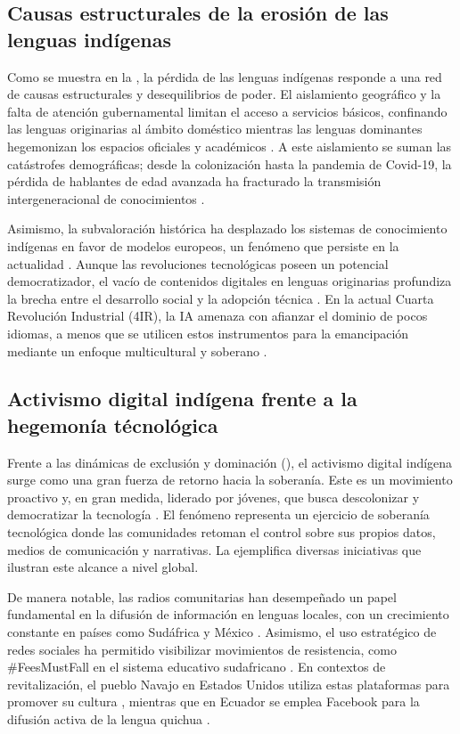 \documentclass[spanish]{textolivre}
\begin{document}
\subsection{Causas estructurales de la erosión de las lenguas indígenas}
Como se muestra en la , la pérdida de las lenguas indígenas responde a una red de causas estructurales y desequilibrios de poder. El aislamiento geográfico y la falta de atención gubernamental limitan el acceso a servicios básicos, confinando las lenguas originarias al ámbito doméstico mientras las lenguas dominantes hegemonizan los espacios oficiales y académicos  \cite{Uekusa2019}. A este aislamiento se suman las catástrofes demográficas; desde la colonización hasta la pandemia de Covid-19, la pérdida de hablantes de edad avanzada ha fracturado la transmisión intergeneracional de conocimientos \cite{GutierrezFonseca2021}.


Asimismo, la subvaloración histórica ha desplazado los sistemas de conocimiento indígenas en favor de modelos europeos, un fenómeno que persiste en la actualidad \cite{GarcesVelasquez2020,Makgopa2022}. Aunque las revoluciones tecnológicas poseen un potencial democratizador, el vacío de contenidos digitales en lenguas originarias profundiza la brecha entre el desarrollo social y la adopción técnica \cite{DeanceBravoTroncoso2017,Joshi2020}. En la actual Cuarta Revolución Industrial (4IR), la IA amenaza con afianzar el dominio de pocos idiomas, a menos que se utilicen estos instrumentos para la emancipación mediante un enfoque multicultural y soberano \cite{Marwala2023}.


\subsection{Activismo digital indígena frente a la hegemonía técnológica}

Frente a las dinámicas de exclusión y dominación (), el activismo digital indígena surge como una gran fuerza de retorno hacia la soberanía. Este es un movimiento proactivo y, en gran medida, liderado por jóvenes, que busca descolonizar y democratizar la tecnología \cite{Marmion2014}. El fenómeno representa un ejercicio de soberanía tecnológica donde las comunidades retoman el control sobre sus propios datos, medios de comunicación y narrativas. La  ejemplifica diversas iniciativas que ilustran este alcance a nivel global.

De manera notable, las radios comunitarias han desempeñado un papel fundamental en la difusión de información en lenguas locales, con un crecimiento constante en países como Sudáfrica \cite{Mkontwana2013} \cite{Omusonga2023} y México \cite{GobiernoMexico2023}. Asimismo, el uso estratégico de redes sociales ha permitido visibilizar movimientos de resistencia, como \#FeesMustFall en el sistema educativo sudafricano \cite{Tshifhumulo2021}. En contextos de revitalización, el pueblo Navajo en Estados Unidos utiliza estas plataformas para promover su cultura \cite{Reyhner2024}, mientras que en Ecuador se emplea Facebook para la difusión activa de la lengua quichua \cite{GarcesVelasquez2020}.
\end{document}
